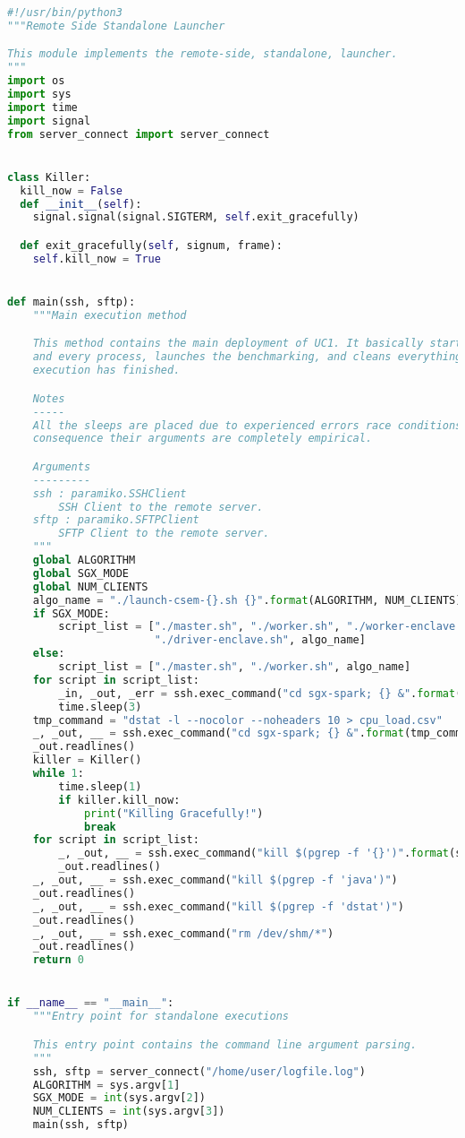 \begin{lstlisting}[language=Python,caption={Server-Side Deployment Script.},label=code:deployment:server]
#!/usr/bin/python3
"""Remote Side Standalone Launcher

This module implements the remote-side, standalone, launcher.
"""
import os
import sys
import time
import signal
from server_connect import server_connect


class Killer:
  kill_now = False
  def __init__(self):
    signal.signal(signal.SIGTERM, self.exit_gracefully)

  def exit_gracefully(self, signum, frame):
    self.kill_now = True


def main(ssh, sftp):
    """Main execution method

    This method contains the main deployment of UC1. It basically starts each
    and every process, launches the benchmarking, and cleans everything when
    execution has finished.

    Notes
    -----
    All the sleeps are placed due to experienced errors race conditions. As a
    consequence their arguments are completely empirical.

    Arguments
    ---------
    ssh : paramiko.SSHClient
        SSH Client to the remote server.
    sftp : paramiko.SFTPClient
        SFTP Client to the remote server.
    """
    global ALGORITHM
    global SGX_MODE
    global NUM_CLIENTS
    algo_name = "./launch-csem-{}.sh {}".format(ALGORITHM, NUM_CLIENTS)
    if SGX_MODE:
        script_list = ["./master.sh", "./worker.sh", "./worker-enclave.sh",
                       "./driver-enclave.sh", algo_name]
    else:
        script_list = ["./master.sh", "./worker.sh", algo_name]
    for script in script_list:
        _in, _out, _err = ssh.exec_command("cd sgx-spark; {} &".format(script))
        time.sleep(3)
    tmp_command = "dstat -l --nocolor --noheaders 10 > cpu_load.csv"
    _, _out, __ = ssh.exec_command("cd sgx-spark; {} &".format(tmp_command))
    _out.readlines()
    killer = Killer()
    while 1:
        time.sleep(1)
        if killer.kill_now:
            print("Killing Gracefully!")
            break
    for script in script_list:
        _, _out, __ = ssh.exec_command("kill $(pgrep -f '{}')".format(script))
        _out.readlines()
    _, _out, __ = ssh.exec_command("kill $(pgrep -f 'java')")
    _out.readlines()
    _, _out, __ = ssh.exec_command("kill $(pgrep -f 'dstat')")
    _out.readlines()
    _, _out, __ = ssh.exec_command("rm /dev/shm/*")
    _out.readlines()
    return 0


if __name__ == "__main__":
    """Entry point for standalone executions

    This entry point contains the command line argument parsing.
    """
    ssh, sftp = server_connect("/home/user/logfile.log")
    ALGORITHM = sys.argv[1]
    SGX_MODE = int(sys.argv[2])
    NUM_CLIENTS = int(sys.argv[3])
    main(ssh, sftp)
\end{lstlisting}

